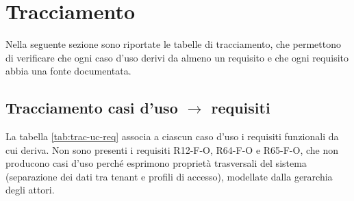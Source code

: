 \section{Tracciamento}

Nella seguente sezione sono riportate le tabelle di tracciamento, che permettono di verificare che ogni caso d'uso derivi da almeno un requisito e che ogni requisito abbia una fonte documentata.

\subsection{Tracciamento casi d'uso $\rightarrow$ requisiti}
La tabella \ref{tab:trac-uc-req} associa a ciascun caso d'uso i requisiti funzionali da cui deriva. Non sono presenti i requisiti R12-F-O, R64-F-O e R65-F-O, che non producono casi d'uso perché esprimono proprietà trasversali del sistema (separazione dei dati tra tenant e profili di accesso), modellate dalla gerarchia degli attori.

